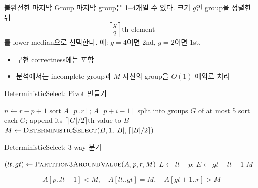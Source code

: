 \begin{frame}{불완전한 마지막 Group}
마지막 group은 1–4개일 수 있다. 크기 $g$인 group을 정렬한 뒤
\[
\left\lceil\frac g2\right\rceil\text{th element}
\]
를 lower median으로 선택한다. 예: $g=4$이면 2nd, $g=2$이면 1st.
\begin{itemize}\item 구현 correctness에는 포함\item 분석에서는 incomplete group과 $M$ 자신의 group을 $O(1)$ 예외로 처리\end{itemize}
\vfill{}
\end{frame}
\begin{frame}{DeterministicSelect: Pivot 만들기}
\small\begin{algorithmic}[1]
\State $n\gets r-p+1$
  \State sort $A[p..r]$; \Return $A[p+i-1]$
\EndIf
\State split into groups $G$ of at most 5
\State sort each $G$; append its $\lceil |G|/2\rceil$th value to $B$
\State $M\gets\Call{DeterministicSelect}{B,1,|B|,\lceil|B|/2\rceil}$
\EndProcedure
\end{algorithmic}
\vfill{}
\end{frame}
\begin{frame}{DeterministicSelect: 3-way 분기}
\small\begin{algorithmic}[1]
\State $(lt,gt)\gets\Call{Partition3AroundValue}{A,p,r,M}$
\State $L\gets lt-p$; $E\gets gt-lt+1$
  \State \Return {}
  \State \Return $M$
\Else
  \State \Return {}
\EndIf
\EndProcedure
\end{algorithmic}
\[
A[p..lt-1]<M,\quad A[lt..gt]=M,\quad A[gt+1..r]>M
\]
\vfill{}
\end{frame}
